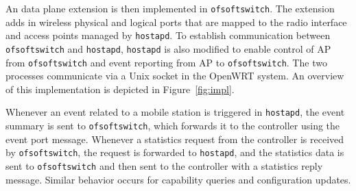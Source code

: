 An \aetherflow data plane extension is then implemented in
\texttt{ofsoftswitch}. The extension adds in wireless physical and logical
ports that are mapped to the radio interface and access points managed by \texttt{hostapd}. To
establish communication between \texttt{ofsoftswitch} and \texttt{hostapd},
\texttt{hostapd} is also modified to enable control of AP from
\texttt{ofsoftswitch} and event reporting from AP to \texttt{ofsoftswitch}. The two
processes communicate via a Unix socket in the OpenWRT system.  An overview of this
implementation is depicted in Figure~\ref{fig:impl}.

Whenever an event related to a mobile station is triggered in \texttt{hostapd},
the event summary is sent to \texttt{ofsoftswitch}, which forwards it to
the controller using the event port message. Whenever a statistics request from the
controller is received by \texttt{ofsoftswitch}, the request is forwarded to
\texttt{hostapd}, and the statistics data is sent to \texttt{ofsoftswitch} and
then sent to the controller with a statistics reply message. Similar behavior
occurs for capability queries and configuration updates.
